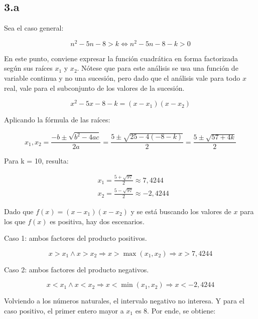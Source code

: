 \documentclass{article}
\newcommand{\subsectionx}[1]{\subsection*{#1}\label{subsec:#1}\addcontentsline{toc}{subsection}{\nameref{subsec:#1}}}
\begin{document}
\subsectionx{3.a}

Sea el caso general:

\begin{equation}
n^2 - 5n -8 > k \Leftrightarrow n^2 - 5n -8 - k > 0
\end{equation}

En este punto, conviene expresar la función cuadrática en forma factorizada según sus raíces $ x_1 $ y $ x_2 $. Nótese que para este análisis se usa una función de variable continua y no una sucesión, pero dado que el análisis vale para todo $ x $ real, vale para el subconjunto de los valores de la sucesión.

\begin{equation}
x^2 - 5x -8 - k = (x-x_1) (x-x_2)
\end{equation}

Aplicando la fórmula de las raíces:

\begin{equation}
x_1, x_2 = \frac{-b \pm \sqrt{b^2 - 4 a c}}{2a} = \frac{5 \pm \sqrt{25 - 4 (-8-k)}}{2} = \frac{5 \pm \sqrt{57 + 4k}}{2}
\end{equation}

Para k = 10, resulta:

\begin{subequations}
\begin{align}
& x_1 = \frac{5+\sqrt{97}}{2} \approx 7,4244 \\
& x_2 = \frac{5-\sqrt{97}}{2} \approx -2,4244
\end{align}
\end{subequations}

Dado que $ f(x) = (x-x_1) (x-x_2) $ y se está buscando los valores de $ x $ para los que $ f(x) $ es positiva, hay dos escenarios.

Caso 1: ambos factores del producto positivos.

\begin{equation}
x > x_1 \wedge x > x_2 \Rightarrow x > \mathop{\text{max}}(x_1, x_2) \Rightarrow x > 7,4244
\end{equation}

Caso 2: ambos factores del producto negativos.

\begin{equation}
x < x_1 \wedge x < x_2 \Rightarrow x < \mathop{\text{min}}(x_1, x_2) \Rightarrow x < -2,4244
\end{equation}

Volviendo a los números naturales, el intervalo negativo no interesa. Y para el caso positivo, el primer entero mayor a $ x_1 $ es 8. Por ende, se obtiene:
\end{document}
